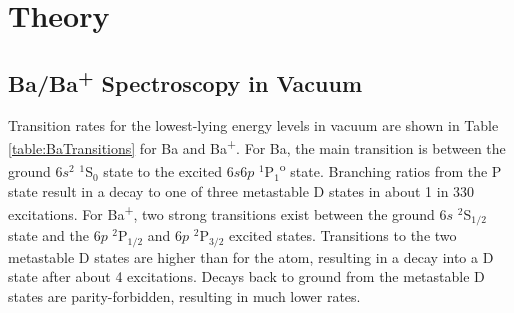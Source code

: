 \chapter{Theory}


\section{Ba/Ba\textsuperscript{+} Spectroscopy in Vacuum}
\label{sec:vacuum}


Transition rates for the lowest-lying energy levels in vacuum are shown in Table \ref{table:BaTransitions} for Ba and Ba\textsuperscript{+}.  For Ba, the main transition is between the ground $6s^{2}$ $^{1}$S$_{0}$ state to the excited $6s6p$ $^{1}$P$_{1}$\textsuperscript{o} state.  Branching ratios from the P state result in a decay to one of three metastable D states in about 1 in 330 excitations.  For Ba\textsuperscript{+}, two strong transitions exist between the ground $6s$ $^{2}$S$_{1/2}$ state and the $6p$ $^{2}$P$_{1/2}$ and $6p$ $^{2}$P$_{3/2}$ excited states.  Transitions to the two metastable D states are higher than for the atom, resulting in a decay into a D state after about 4 excitations.  Decays back to ground from the metastable D states are parity-forbidden, resulting in much lower rates.


